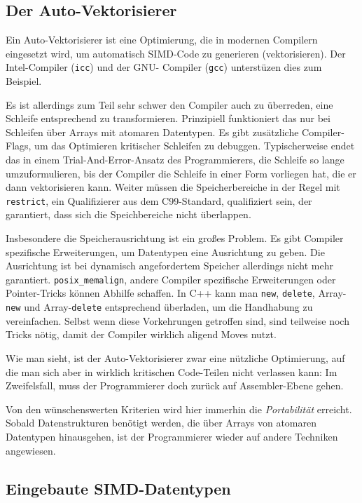 \documentclass[a4paper,10pt]{article}
\begin{document}
\subsection{Der Auto-Vektorisierer}

Ein Auto-Vektorisierer ist eine Optimierung, die in modernen Compilern eingesetzt wird, um
automatisch SIMD-Code zu generieren (vektorisieren). Der Intel-Compiler (\texttt{icc}) und der GNU-
Compiler (\texttt{gcc}) unterstüzen dies zum Beispiel. 

Es ist allerdings zum Teil sehr schwer den Compiler auch zu überreden, eine Schleife entsprechend zu
transformieren. Prinzipiell funktioniert das nur bei Schleifen über Arrays mit atomaren Datentypen.
Es gibt zusätzliche Compiler-Flags, um das Optimieren kritischer Schleifen zu debuggen.
Typischerweise endet das in einem Trial-And-Error-Ansatz des Programmierers, die Schleife so lange
umzuformulieren, bis der Compiler die Schleife in einer Form vorliegen hat, die er dann
vektorisieren kann. Weiter müssen die Speicherbereiche in der Regel mit \texttt{restrict}, ein
Qualifizierer aus dem C99-Standard, qualifiziert sein, der garantiert, dass sich die Speichbereiche
nicht überlappen.

Insbesondere die Speicherausrichtung ist ein großes Problem. Es gibt Compiler spezifische
Erweiterungen, um Datentypen eine Ausrichtung zu geben. Die Ausrichtung ist bei dynamisch
angefordertem Speicher allerdings nicht mehr garantiert. \texttt{posix\_memalign}, andere Compiler
spezifische Erweiterungen oder Pointer-Tricks können Abhilfe schaffen. In C++ kann man \texttt{new},
\texttt{delete}, Array-\texttt{new} und Array-\texttt{delete} entsprechend überladen, um die
Handhabung zu vereinfachen. Selbst wenn diese Vorkehrungen getroffen sind, sind teilweise noch
Tricks nötig, damit der Compiler wirklich aligend Moves nutzt.

Wie man sieht, ist der Auto-Vektorisierer zwar eine nützliche Optimierung, auf die man sich aber in wirklich
kritischen Code-Teilen nicht verlassen kann: Im Zweifelsfall, muss der Programmierer doch zurück auf 
Assembler-Ebene gehen.

Von den wünschenswerten Kriterien wird hier immerhin die \emph{Portabilität} erreicht. Sobald
Datenstrukturen benötigt werden, die über Arrays von atomaren Datentypen hinausgehen, ist der
Programmierer wieder auf andere Techniken angewiesen.

\subsection{Eingebaute SIMD-Datentypen}
\end{document}

